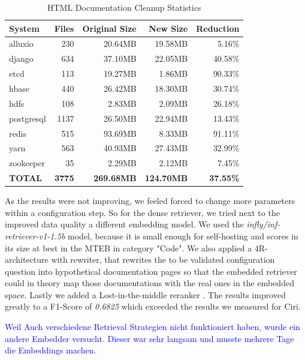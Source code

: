 \begin{table}[h]
    \centering
    \begin{tabular}{|l|r|r|r|r|}
        \hline
        \textbf{System} & \textbf{Files} & \textbf{Original Size} & \textbf{New Size} & \textbf{Reduction} \\
        \hline
        alluxio & 230 & 20.64MB & 19.58MB & 5.16\% \\
        django & 634 & 37.10MB & 22.05MB & 40.58\% \\
        etcd & 113 & 19.27MB & 1.86MB & 90.33\% \\
        hbase & 440 & 26.42MB & 18.30MB & 30.74\% \\
        hdfs & 108 & 2.83MB & 2.09MB & 26.18\% \\
        postgresql & 1137 & 26.50MB & 22.94MB & 13.43\% \\
        redis & 515 & 93.69MB & 8.33MB & 91.11\% \\
        yarn & 563 & 40.93MB & 27.43MB & 32.99\% \\
        zookeeper & 35 & 2.29MB & 2.12MB & 7.45\% \\
        \hline
        \textbf{TOTAL} & \textbf{3775} & \textbf{269.68MB} & \textbf{124.70MB} & \textbf{37.55\%} \\
        \hline
    \end{tabular}
    \caption{HTML Documentation Cleanup Statistics}
    \label{tab:cleanup_stats}
\end{table}

As the results were not improving, we feeled forced to change more parameters within a configuration step. So for the dense retriever, we tried next to the improved data quality a different embedding model. We used the \textit{infly/inf-retriever-v1-1.5b} \cite{inflyai2025} model, because it is small enough for self-hosting and scores in its size at best in the MTEB \cite{muennighoff2022mteb} \cite{MTEB} in category "Code". We also applied a 4R-architecture with rewriter, that rewrites the to be validated configuration question into hypothetical documentation pages so that the embedded retriever could in theory map those documentations with the real ones in the embedded space. Lastly we added a Lost-in-the-middle reranker \cite{Liu.06.07.2023}. The results improved greatly to a F1-Score of \textit{0.6825} which exceeded the results we measured for Ciri. 


\textcolor{blue}{Weil Auch verschiedene Retrieval Strategien nicht funktioniert haben, wurde ein andere Embedder versucht. Dieser war sehr langsam und musste mehrere Tage die Embeddings machen.}

